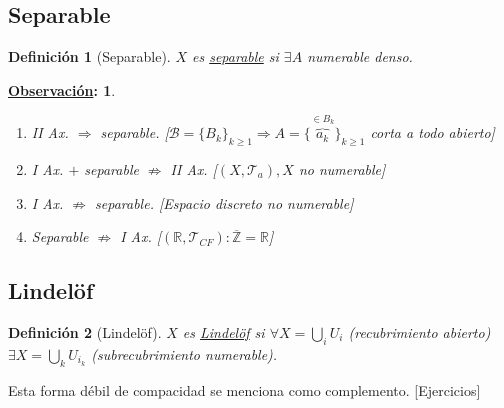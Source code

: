 \documentclass[10pt,a4paper,openright]{book}
\theoremstyle{break}
\newtheorem*{defi}{Definición}
\newtheorem*{obs}{\underline{Observación}:}
\begin{document}
\subsection{Separable}%
\label{sub:separable}
\begin{defi}[Separable]
$X$ es \underline{separable} si $\exists A$ numerable denso.
\end{defi}
\begin{obs}
\begin{enumerate}
    \item II Ax. $\Rightarrow$ separable. [$\mathcal{B} = \{B_k\}_{k \ge 1} \Rightarrow A = \{\overbrace{a_k}^{\in B_k}\}_{k \ge 1}$ corta a todo abierto]
    \item I Ax. $+$ separable $\not \Rightarrow$ II Ax. [$\left( X, \mathcal{T}_a \right), X$ no numerable]
    \item I Ax. $\not \Rightarrow$ separable. [Espacio discreto no numerable]
    \item Separable $\not \Rightarrow$ I Ax. [$\left( \mathbb{R}, \mathcal{T}_{CF} \right) : \overline{\mathbb{Z}} = \mathbb{R}$]
\end{enumerate}
\end{obs}

\subsection{Lindelöf}%
\label{sub:lindelof}
\begin{defi}[Lindelöf]
$X$ es \underline{Lindelöf} si $\forall X = \bigcup_{i} U_i$ (recubrimiento abierto) $\exists X = \bigcup_{k} U_{i_k}$ (subrecubrimiento numerable). 
\end{defi}

Esta forma débil de compacidad se menciona como complemento. [Ejercicios]
\end{document}
